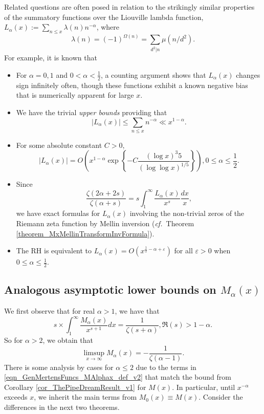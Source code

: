 \documentclass[11pt,reqno,a4letter]{article}
\numberwithin{figure}{section}
\numberwithin{table}{section}
\newcommand{\cf}{\textit{cf.\ }}
\theoremstyle{plain}
\numberwithin{theorem}{section}
\theoremstyle{definition}
\begin{document}
Related questions are often posed in relation to the strikingly 
similar properties of the 
summatory functions over the Liouville lambda function, 
$L_{\alpha}(x) := \sum_{n \leq x} \lambda(n) n^{-\alpha}$, where 
$$\lambda(n) = (-1)^{\Omega(n)} = \sum_{d^2|n} \mu(n/d^2).$$  
For example, it is known that \cite{JNT-HUMPHRIES-2013} 
\begin{itemize} 
     \item For $\alpha = 0, 1$ and $0 < \alpha < \frac{1}{2}$, a counting argument shows that 
     $L_{\alpha}(x)$ changes sign infinitely often, though these functions exhibit a known 
     negative bias that is numerically apparent for large $x$. 
     \item We have the trivial \emph{upper bounds} providing that 
     \[
     |L_{\alpha}(x)| \leq \sum_{n \leq x} n^{-\alpha} \ll x^{1-\alpha}. 
     \]
     \item For some absolute constant $C > 0$, 
     \[
     |L_{\alpha}(x)| = O\left(x^{1-\alpha} \exp\left\{-C \frac{(\log x)^{3}{5}}{(\log\log x)^{1/5}} 
          \right\}\right), 0 \leq \alpha \leq \frac{1}{2}. 
     \]
     \item Since 
     \[
     \frac{\zeta(2\alpha+2s)}{\zeta(\alpha+s)} = s \int_1^{\infty} \frac{L_{\alpha}(x)}{x^s} \frac{dx}{x}, 
     \]
     we have exact formulas for $L_{\alpha}(x)$ involving the non-trivial zeros of the 
     Riemann zeta function by Mellin inversion (\cf Theorem \ref{theorem_MxMellinTransformInvFormula}).  
     \item The RH is equivalent to $L_{\alpha}(x) = O(x^{\frac{1}{2}-\alpha+\varepsilon})$ for all 
           $\varepsilon > 0$ when $0 \leq \alpha \leq \frac{1}{2}$. 
\end{itemize} 

\subsection{Analogous asymptotic lower bounds on $M_{\alpha}(x)$} 

We first observe that for real $\alpha > 1$, we have that 
\[
s \times \int_1^{\infty} \frac{M_{\alpha}(x)}{x^{s+1}} dx = \frac{1}{\zeta(s+\alpha)}, \Re(s) > 1-\alpha. 
\]
So for $\alpha > 2$, we obtain that 
\[
\limsup\limits_{x \rightarrow \infty} M_{\alpha}(x) = -\frac{1}{\zeta(\alpha-1)}. 
\]
There is some analysis by cases for $\alpha \leq 2$ due to the terms in 
\eqref{eqn_GenMertensFuncs_MAlphax_def_v2} that match the bound from 
Corollary \ref{cor_ThePipeDreamResult_v1} for $M(x)$. 
In particular, until $x^{-\alpha}$ exceeds $x$, we inherit the main terms from 
$M_0(x) \equiv M(x)$. Consider the differences in the next two theorems. 
\end{document}
